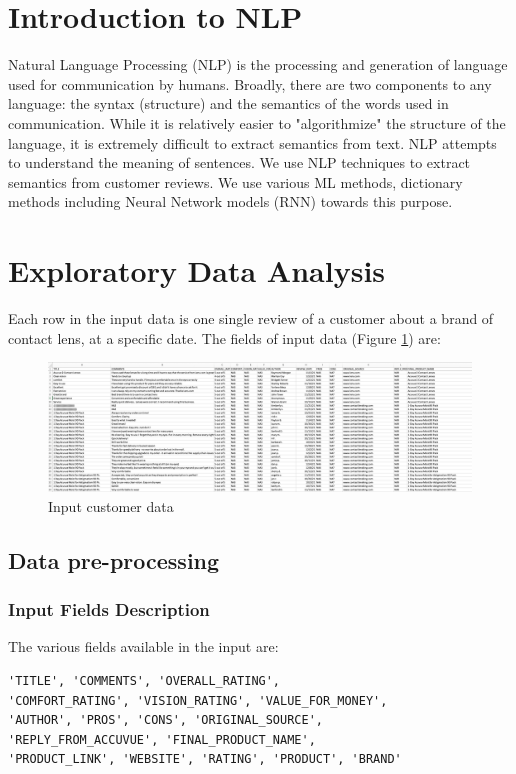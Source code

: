 \documentclass[11pt, letterpaper]{article}
\begin{document}
\section{Introduction to NLP}
Natural Language Processing (NLP) is the processing and generation of language used for communication by humans. Broadly, there are two components to any language: the syntax (structure) and the semantics of the words used in communication. While it is relatively easier to "algorithmize" the structure of the language, it is extremely difficult to extract semantics from text. NLP attempts to understand the meaning of sentences. We use NLP techniques to extract semantics from customer reviews. We use various ML methods, dictionary methods including Neural Network models (RNN) towards this purpose.

\section {Exploratory Data Analysis}
Each row in the input data is one single review of a customer about a brand of contact lens, at a specific date. The fields of input data (Figure \ref{fig:input}) are:
\begin{figure}[H]%
    \centering
    \includegraphics[width=\linewidth]{raw_data.png}%
    \caption{Input customer data}%
    \label{fig:input}
\end{figure}
\subsection {Data pre-processing}
\subsubsection{Input Fields Description}
The various fields available in the input are: 
\begin{verbatim}
'TITLE', 'COMMENTS', 'OVERALL_RATING', 
'COMFORT_RATING', 'VISION_RATING', 'VALUE_FOR_MONEY', 
'AUTHOR', 'PROS', 'CONS', 'ORIGINAL_SOURCE', 
'REPLY_FROM_ACCUVUE', 'FINAL_PRODUCT_NAME', 
'PRODUCT_LINK', 'WEBSITE', 'RATING', 'PRODUCT', 'BRAND'
\end{verbatim}
\end{document}
